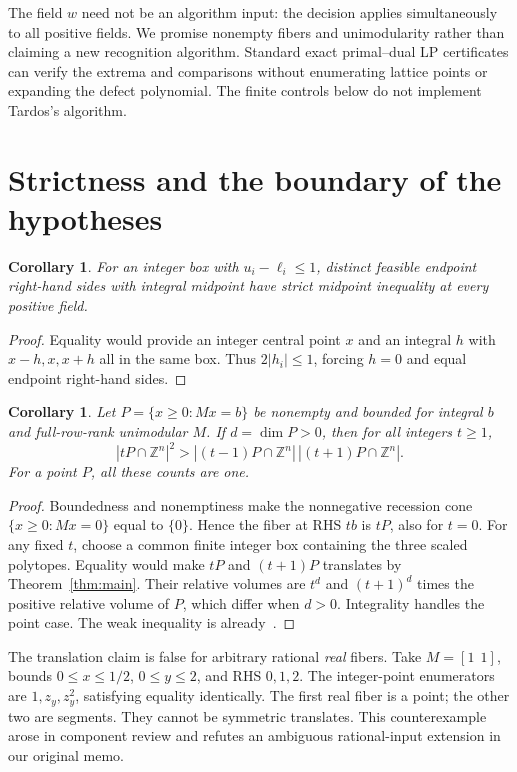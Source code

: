 \documentclass[11pt]{article}
\newtheorem{corollary}[theorem]{Corollary}
\newcommand{\Z}{\mathbb Z}\newcommand{\R}{\mathbb R}\newcommand{\C}{\mathbb C}
\begin{document}
The field \(w\) need not be an algorithm input: the decision applies simultaneously to all positive fields. We promise nonempty fibers and unimodularity rather than claiming a new recognition algorithm. Standard exact primal--dual LP certificates can verify the extrema and comparisons without enumerating lattice points or expanding the defect polynomial. The finite controls below do not implement Tardos's algorithm.

\section{Strictness and the boundary of the hypotheses}
\begin{corollary}\label{cor:binary}
For an integer box with \(u_i-\ell_i\le1\), distinct feasible endpoint right-hand sides with integral midpoint have strict midpoint inequality at every positive field.
\end{corollary}
\begin{proof}
Equality would provide an integer central point \(x\) and an integral \(h\) with \(x-h,x,x+h\) all in the same box. Thus \(2|h_i|\le1\), forcing \(h=0\) and equal endpoint right-hand sides.
\end{proof}

\begin{corollary}\label{cor:ehrhart}
Let \(P=\{x\ge0:Mx=b\}\) be nonempty and bounded for integral \(b\) and full-row-rank unimodular \(M\).
If \(d=\dim P>0\), then for all integers \(t\ge1\),
\[
|tP\cap\Z^n|^2>
|(t-1)P\cap\Z^n|\,|(t+1)P\cap\Z^n|.
\]
For a point \(P\), all these counts are one.
\end{corollary}
\begin{proof}
Boundedness and nonemptiness make the nonnegative recession cone \(\{x\ge0:Mx=0\}\) equal to \(\{0\}\). Hence the fiber at RHS \(tb\) is \(tP\), also for \(t=0\). For any fixed \(t\), choose a common finite integer box containing the three scaled polytopes. Equality would make \(tP\) and \((t+1)P\) translates by Theorem~\ref{thm:main}. Their relative volumes are \(t^d\) and \((t+1)^d\) times the positive relative volume of \(P\), which differ when \(d>0\). Integrality handles the point case. The weak inequality is already~\cite[Corollary 3.5]{LMY}.
\end{proof}

The translation claim is false for arbitrary rational \emph{real} fibers.
Take \(M=[1\ \ 1]\), bounds \(0\le x\le1/2\), \(0\le y\le2\), and RHS \(0,1,2\). The integer-point enumerators are \(1,z_y,z_y^2\), satisfying equality identically. The first real fiber is a point; the other two are segments. They cannot be symmetric translates. This counterexample arose in component review and refutes an ambiguous rational-input extension in our original memo.
\end{document}
